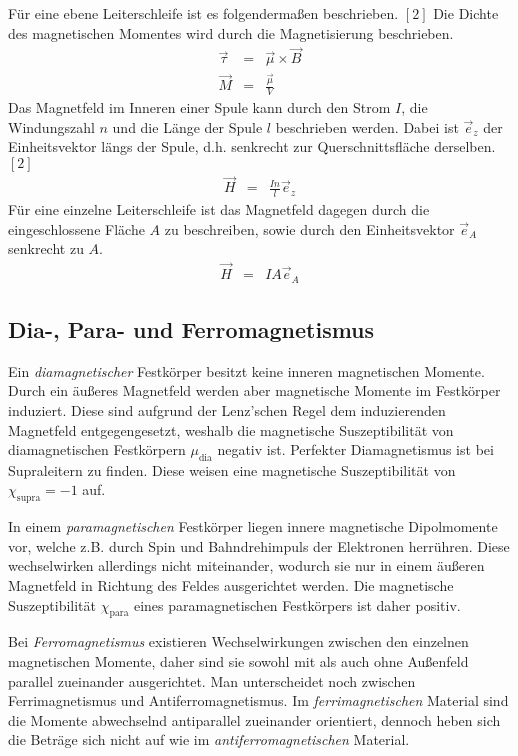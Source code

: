 \documentclass[12pt,a4paper]{scrartcl}
\numberwithin{equation}{section} %
\renewcommand{\[}{} %
\renewcommand{\]}{\noindent} %
\begin{document}
Für eine ebene Leiterschleife ist es folgendermaßen beschrieben. \([2]\)
Die Dichte des magnetischen Momentes wird durch die Magnetisierung
beschrieben. \[
\begin{eqnarray}
    \vec \tau &=& \vec \mu \times \vec B \\
    \vec M &=& \frac{\vec \mu}{V}
\end{eqnarray}
\] Das Magnetfeld im Inneren einer Spule kann durch den Strom \(I\), die
Windungszahl \(n\) und die Länge der Spule \(l\) beschrieben werden.
Dabei ist \(\vec e_z\) der Einheitsvektor längs der Spule, d.h.
senkrecht zur Querschnittsfläche derselben. \([2]\) \[
\begin{eqnarray}
    \vec H &=& \frac{In}{l} \vec e_z \label{H(I)}
\end{eqnarray}
\] Für eine einzelne Leiterschleife ist das Magnetfeld dagegen durch die
eingeschlossene Fläche \(A\) zu beschreiben, sowie durch den
Einheitsvektor \(\vec e_A\) senkrecht zu \(A\). \[
\begin{eqnarray}
    \vec H &=& IA \vec e_A
\end{eqnarray}
\]

\hypertarget{dia--para--und-ferromagnetismus}{%
\subsection{Dia-, Para- und
Ferromagnetismus}\label{dia--para--und-ferromagnetismus}}

Ein \emph{diamagnetischer} Festkörper besitzt keine inneren magnetischen
Momente. Durch ein äußeres Magnetfeld werden aber magnetische Momente im
Festkörper induziert. Diese sind aufgrund der Lenz'schen Regel dem
induzierenden Magnetfeld entgegengesetzt, weshalb die magnetische
Suszeptibilität von diamagnetischen Festkörpern \(\mu_\mathrm{dia}\)
negativ ist. Perfekter Diamagnetismus ist bei Supraleitern zu finden.
Diese weisen eine magnetische Suszeptibilität von
\(\chi_\mathrm{supra} = -1\) auf.

In einem \emph{paramagnetischen} Festkörper liegen innere magnetische
Dipolmomente vor, welche z.B. durch Spin und Bahndrehimpuls der
Elektronen herrühren. Diese wechselwirken allerdings nicht miteinander,
wodurch sie nur in einem äußeren Magnetfeld in Richtung des Feldes
ausgerichtet werden. Die magnetische Suszeptibilität
\(\chi_\mathrm{para}\) eines paramagnetischen Festkörpers ist daher
positiv.

Bei \emph{Ferromagnetismus} existieren Wechselwirkungen zwischen den
einzelnen magnetischen Momente, daher sind sie sowohl mit als auch ohne
Außenfeld parallel zueinander ausgerichtet. Man unterscheidet noch
zwischen Ferrimagnetismus und Antiferromagnetismus. Im
\emph{ferrimagnetischen} Material sind die Momente abwechselnd
antiparallel zueinander orientiert, dennoch heben sich die Beträge sich
nicht auf wie im \emph{antiferromagnetischen} Material.
\end{document}
